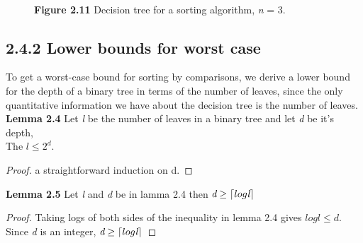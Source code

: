 \documentclass[a4paper,10pt,titlepage]{report}
\DeclarePairedDelimiter{\ceil}{\lceil}{\rceil}
\begin{document}
    
    
\begin{figure}[h]
\\
\caption{\textbf{Figure 2.11} Decision tree for a sorting algorithm, \textit{n} = 3.}
\end{figure}

\subsection{2.4.2 Lower bounds for worst case}

To get a worst-case bound for sorting by comparisons, we derive a lower bound for the depth of a binary tree in terms of the number of leaves, since the only quantitative information we have about the decision tree is the number of leaves. \\
\vspace{5mm}
\textbf{Lemma 2.4} Let \textit{l} be the number of leaves in a binary tree and let \textit{d} be it's depth, \\
The $\textit{l} \leq 2^d$.
\vspace{5mm}
\begin{proof}
a straightforward induction on d.
\end{proof}




\vspace{5mm}
\textbf{Lemma 2.5} Let \textit{l} and \textit{d} be in lamma 2.4 then $\textit{d} \geq \ceil{log \textit{l}}$
\vspace{5mm}
\begin{proof}
Taking logs of both sides of the inequality in lemma 2.4 gives $log \textit{l} \leq \textit{d}$. Since \textit{d} is an integer, $ \textit{d} \geq \ceil{log \textit{l}}$
\end{proof}
\end{document}
